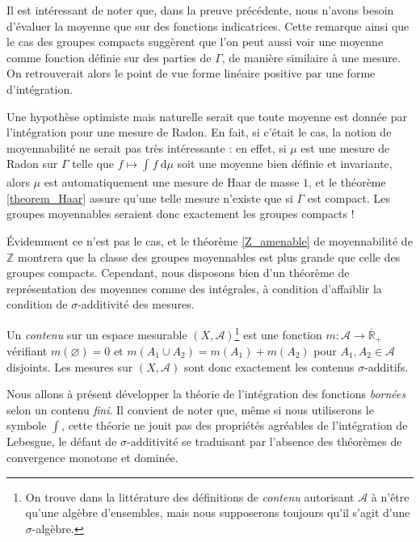 \documentclass[a4paper,12pt]{article}
\newcommand{\R}{\mathbb{R}}
\newcommand{\Z}{\mathbb{Z}}
\newcommand{\integral}[4]{\int_{#1}^{#2} #3~\mathrm{d}#4}
\newcommand{\closure}[1]{\overline{#1}}
\newcommand{\TODO}[1]{}%
\begin{document}
Il est intéressant de noter que, dans la preuve précédente, nous n'avons besoin d'évaluer la moyenne que sur des fonctions indicatrices.
Cette remarque ainsi que le cas des groupes compacts suggèrent que l'on peut aussi voir une moyenne comme fonction 
définie sur des parties de $\Gamma$, de manière similaire à une mesure. On retrouverait alors le point de vue \og{}forme 
linéaire positive\fg{} par une forme d'intégration.

Une hypothèse optimiste mais naturelle serait que toute moyenne est donnée par l'intégration pour une mesure 
de Radon. En fait, si c'était le cas, la notion de moyennabilité ne serait pas très intéressante :
en effet, si $\mu$ est une mesure de Radon sur $\Gamma$ telle que $f\mapsto\integral{}{}{f}{\mu}$ soit une moyenne bien définie et invariante,
alors $\mu$ est automatiquement une mesure de Haar de masse $1$, et le théorème \ref{theorem_Haar} assure qu'une telle mesure n'existe que si
$\Gamma$ est compact. Les groupes moyennables seraient donc exactement les groupes compacts !

Évidemment ce n'est pas le cas, et le théorème \ref{Z_amenable} de moyennabilité de $\Z$ montrera que la classe des groupes moyennables est plus grande que 
celle des groupes compacts. Cependant, nous disposons bien d'un théorème de représentation des moyennes comme des
\og{}intégrales\fg{}, à condition d'affaiblir la condition de $\sigma$-additivité des mesures.

Un \emph{contenu} sur un espace mesurable $(X, \mathcal{A})$\footnote{On trouve dans la littérature des définitions de \emph{contenu} autorisant $\mathcal{A}$ à n'être qu'une algèbre d'ensembles,
mais nous supposerons toujours qu'il s'agit d'une $\sigma$-algèbre.} est une fonction $m:\mathcal{A}\to\closure{\R}_+$ vérifiant $m(\varnothing) = 0$
et $m(A_1\cup A_2) = m(A_1) + m(A_2)$ pour $A_1, A_2\in\mathcal{A}$ disjoints. Les mesures sur $(X, \mathcal{A})$
sont donc exactement les contenus $\sigma$-additifs. 

Nous allons à présent développer la théorie de l'intégration des fonctions \emph{bornées} selon un contenu \emph{fini}. Il convient de noter que,
même si nous utiliserons le symbole $\int$, cette théorie ne jouit pas des propriétés agréables de l'intégration de Lebesgue,
le défaut de $\sigma$-additivité se traduisant par l'absence des théorèmes de convergence monotone et dominée.
\end{document}
